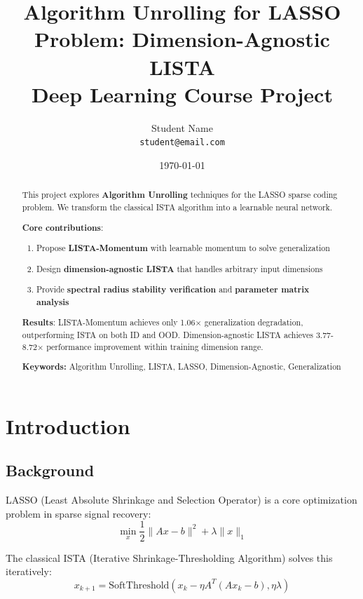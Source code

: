\documentclass[11pt,a4paper]{article}
\title{Algorithm Unrolling for LASSO Problem: Dimension-Agnostic LISTA\\
\large Deep Learning Course Project}
\author{Student Name\\
\texttt{student@email.com}}
\date{\today}
\begin{document}
\maketitle

\begin{abstract}
This project explores \textbf{Algorithm Unrolling} techniques for the LASSO sparse coding problem. We transform the classical ISTA algorithm into a learnable neural network.

\textbf{Core contributions}:
\begin{enumerate}
    \item Propose \textbf{LISTA-Momentum} with learnable momentum to solve generalization
    \item Design \textbf{dimension-agnostic LISTA} that handles arbitrary input dimensions
    \item Provide \textbf{spectral radius stability verification} and \textbf{parameter matrix analysis}
\end{enumerate}

\textbf{Results}: LISTA-Momentum achieves only 1.06× generalization degradation, outperforming ISTA on both ID and OOD. Dimension-agnostic LISTA achieves 3.77-8.72× performance improvement within training dimension range.

\bigskip
\noindent\textbf{Keywords:} Algorithm Unrolling, LISTA, LASSO, Dimension-Agnostic, Generalization
\end{abstract}

\tableofcontents
\newpage

\section{Introduction}
\label{sec:intro}

\subsection{Background}

LASSO (Least Absolute Shrinkage and Selection Operator) is a core optimization problem in sparse signal recovery:
\begin{equation}
    \min_x \frac{1}{2} \|Ax - b\|^2 + \lambda \|x\|_1
\end{equation}

The classical ISTA (Iterative Shrinkage-Thresholding Algorithm) solves this iteratively:
\begin{equation}
    x_{k+1} = \text{SoftThreshold}(x_k - \eta A^T(Ax_k - b), \eta\lambda)
\end{equation}
\end{document}
